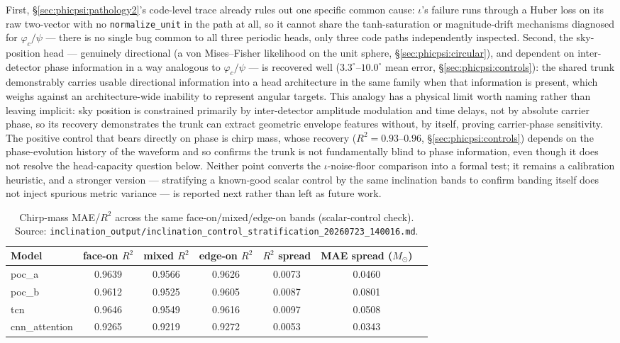 First, \S\ref{sec:phicpsi:pathology2}'s code-level trace already rules out one specific common cause: $\iota$'s failure runs through a Huber loss on its raw two-vector with no \texttt{normalize\_unit} in the path at all, so it cannot share the tanh-saturation or magnitude-drift mechanisms diagnosed for $\varphi_c/\psi$ --- there is no single bug common to all three periodic heads, only three code paths independently inspected.
Second, the sky-position head --- genuinely directional (a von Mises--Fisher likelihood on the unit sphere, \S\ref{sec:phicpsi:circular}), and dependent on inter-detector phase information in a way analogous to $\varphi_c/\psi$ --- is recovered well ($3.3^\circ$--$10.0^\circ$ mean error, \S\ref{sec:phicpsi:controls}): the shared trunk demonstrably carries usable directional information into a head architecture in the same family when that information is present, which weighs against an architecture-wide inability to represent angular targets.
This analogy has a physical limit worth naming rather than leaving implicit: sky position is constrained primarily by inter-detector amplitude modulation and time delays, not by absolute carrier phase, so its recovery demonstrates the trunk can extract geometric envelope features without, by itself, proving carrier-phase sensitivity.
The positive control that bears directly on phase is chirp mass, whose recovery ($R^2 = 0.93$--$0.96$, \S\ref{sec:phicpsi:controls}) depends on the phase-evolution history of the waveform and so confirms the trunk is not fundamentally blind to phase information, even though it does not resolve the head-capacity question below.
Neither point converts the $\iota$-noise-floor comparison into a formal test; it remains a calibration heuristic, and a stronger version --- stratifying a known-good scalar control by the same inclination bands to confirm banding itself does not inject spurious metric variance --- is reported next rather than left as future work.

\begin{table}[tbp]
    \centering
    \caption{Chirp-mass MAE/$R^2$ across the same face-on/mixed/edge-on bands (scalar-control check).
    Source: \texttt{inclination\_output/inclination\_control\_stratification\_20260723\_140016.md}.}
    \label{tab:phicpsi:controlstrat}
    \small
    \begin{tabular}{@{}lcccccc@{}}
        \toprule
        Model & face-on $R^2$ & mixed $R^2$ & edge-on $R^2$ & $R^2$ spread & MAE spread ($M_\odot$) \\
        \midrule
        poc\_a         & 0.9639 & 0.9566 & 0.9626 & 0.0073 & 0.0460 \\
        poc\_b         & 0.9612 & 0.9525 & 0.9605 & 0.0087 & 0.0801 \\
        tcn            & 0.9646 & 0.9549 & 0.9616 & 0.0097 & 0.0508 \\
        cnn\_attention & 0.9265 & 0.9219 & 0.9272 & 0.0053 & 0.0343 \\
        \bottomrule
    \end{tabular}
\end{table}

